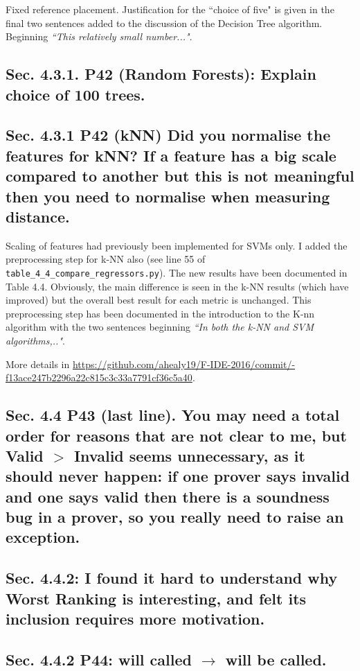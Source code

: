 \documentclass[]{article}
\begin{document}
Fixed reference placement. Justification for the ``choice of five" is given in the final two sentences added to the discussion of the Decision Tree algorithm. Beginning \emph{``This relatively small number..."}. 

\subsection{Sec. 4.3.1. P42 (Random Forests): Explain choice of 100 trees.} 
	
\subsection{Sec. 4.3.1 P42 (kNN) Did you normalise the features for kNN? If a feature has a big scale compared to another but this is not meaningful then you need to normalise when measuring distance.}

Scaling of features had previously been implemented for SVMs only. I added the preprocessing step for k-NN also (see line 55 of \texttt{table\_4\_4\_compare\_regressors.py}). 
The new results have been documented in Table 4.4. 
Obviously, the main difference is seen in the k-NN results (which have improved) but the overall best result for each metric is unchanged.
This preprocessing step has been documented in the introduction to the K-nn algorithm with the two sentences beginning \emph{``In both the k-NN and SVM algorithms,.."}. 

\sloppypar
More details in \url{https://github.com/ahealy19/F-IDE-2016/commit/-f13ace247b2296a22c815c3c33a7791cf36c5a40}.

\subsection{Sec. 4.4 P43 (last line). You may need a total order for reasons that are not clear to me, but Valid $>$ Invalid seems unnecessary, as it should never happen: if one prover says invalid and one says valid then there is a soundness bug in a prover, so you really need to raise an exception.}

\subsection{Sec. 4.4.2: I found it hard to understand why Worst Ranking is interesting, and felt its inclusion requires more motivation.}

\subsection{Sec. 4.4.2 P44: will called $\rightarrow$ will be called.}
\end{document}
